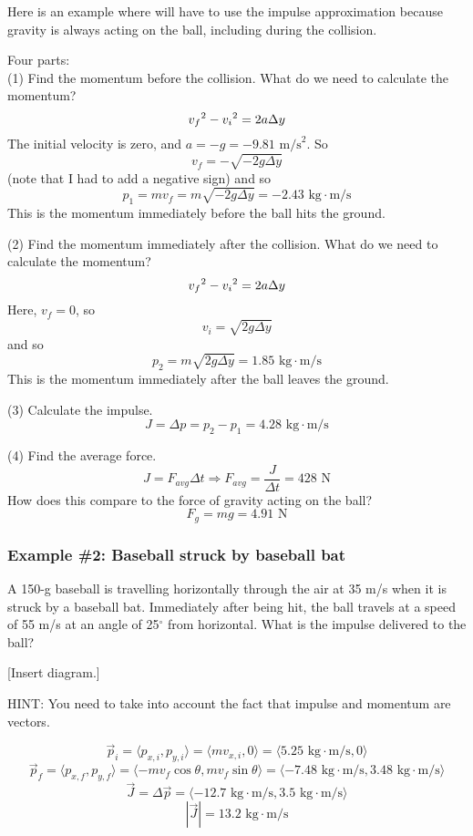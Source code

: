 Here is an example where will have to use the impulse approximation because gravity is always acting on the ball, including during the collision.

Four parts:\\
(1) Find the momentum before the collision. What do we need to calculate the momentum?
$$v_f\displaystyle^2-v_i\displaystyle^2=2a\Delta{y}$$
The initial velocity is zero, and $a=-g=-9.81\mbox{ m/s}^2$. So
$$v_f=-\sqrt{-2g\Delta{y}}$$
(note that I had to add a negative sign) and so 
$$p_1=mv_f=m\sqrt{-2g\Delta{y}}=-2.43\mbox{ kg}\cdot\mbox{m/s}$$
This is the momentum immediately before the ball hits the ground.

(2) Find the momentum immediately after the collision. What do we need to calculate the momentum?
$$v_f\displaystyle^2-v_i\displaystyle^2=2a\Delta{y}$$
Here, $v_f=0$, so
$$v_i=\sqrt{2g\Delta{y}}$$
and so
$$p_2=m\sqrt{2g\Delta{y}}=1.85\mbox{ kg}\cdot\mbox{m/s}$$
This is the momentum immediately after the ball leaves the ground.

(3) Calculate the impulse.
$$J=\Delta{p}=p_2-p_1=4.28\mbox{ kg}\cdot\mbox{m/s}$$

(4) Find the average force.
$$J=F_{avg}\Delta{t}\Rightarrow F_{avg}=\frac{J}{\Delta{t}}=428\mbox{ N}$$
How does this compare to the force of gravity acting on the ball?
$$F_g=mg=4.91\mbox{ N}$$

\subsubsection{Example \#2: Baseball struck by baseball bat}
A 150-g baseball is travelling horizontally through the air at 35 m/s when it is struck by a baseball bat. Immediately after being hit, the ball travels at a speed of 55 m/s at an angle of 25$^\circ$ from horizontal. What is the impulse delivered to the ball?

[Insert diagram.]
\vspace{5cm}

HINT: You need to take into account the fact that impulse and momentum are vectors.

$$\vec{p}_i=\langle{p_{x,i},p_{y,i}}\rangle=\langle{mv_{x,i},0}\rangle=\langle{5.25\mbox{ kg}\cdot\mbox{m/s},0}\rangle$$
$$\vec{p}_f=\langle{p_{x,f},p_{y,f}}\rangle=\langle{-mv_f\cos\theta,mv_f\sin\theta}\rangle=\langle{-7.48\mbox{ kg}\cdot\mbox{m/s},3.48\mbox{ kg}\cdot\mbox{m/s}}\rangle$$
$$\vec{J}=\Delta{\vec{p}}=\langle{-12.7\mbox{ kg}\cdot\mbox{m/s},3.5\mbox{ kg}\cdot\mbox{m/s}}\rangle$$
$$|\vec{J}|=13.2\mbox{ kg}\cdot\mbox{m/s}$$


